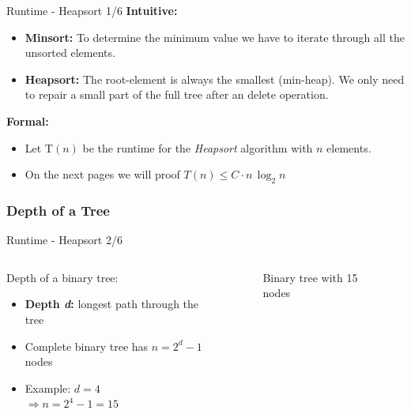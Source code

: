 \documentclass{beamer}
\begin{document}
\begin{frame}{Runtime - Heapsort 1/6}
  \textbf{Intuitive:}
  \begin{itemize}
    \item
      \textbf{Minsort:}
      To determine the minimum value we have to iterate through all the
      unsorted elements.
    \item
      \textbf{Heapsort:}
      The root-element is always the smallest (min-heap).
      We only need to repair a small part of the full tree after an delete
      operation.
  \end{itemize}
  \textbf{Formal:}
  \begin{itemize}
    \item 
      Let T$(n)$ be the runtime for the \textit{Heapsort}
      algorithm with $n$ elements.
    \item
      On the next pages we will proof $T(n) \leq C \cdot n \, \log_2 n$
  \end{itemize}
\end{frame}

\subsubsection{Depth of a Tree}

\begin{frame}{Runtime - Heapsort 2/6}
  \begin{columns}
    \begin{column}{0.5\textwidth}
      Depth of a binary tree:
      \begin{itemize}
        \item
          \textbf{Depth \textit{d}:}
          longest path through the tree
        \item
          Complete binary tree has $n = 2^d - 1$ nodes
        \item
          Example: $d = 4$\\
          $\Rightarrow n = 2^4 - 1 = 15$
      \end{itemize}
    \end{column}
    \begin{column}{0.5\textwidth}
      \begin{figure}
        \begin{centering}%
          \caption{Binary tree with 15 nodes}%
          \label{fig:binary_tree}%
        \end{centering}%
      \end{figure}
    \end{column}
  \end{columns}
\end{frame}
\end{document}
